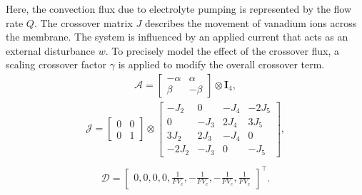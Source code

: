 Here, the convection flux due to electrolyte pumping is represented by the flow rate $Q$. The crossover matrix $J$ describes the movement of vanadium ions across the membrane. The system is influenced by an applied current that acts as an external disturbance $w$. To precisely model the effect of the crossover flux, a scaling crossover factor $\gamma$ is applied to modify the overall crossover term.
\begin{equation}
    \begin{gathered}
    \mathcal{A}=\left[\begin{array}{rr}
    -\alpha & \alpha \\
    \beta & -\beta
    \end{array}\right] \otimes \mathbf{I}_4,
    \end{gathered}
\end{equation}
\begin{equation}
    \begin{gathered}
    \mathcal{J}=\left[\begin{array}{ll}
    0 & 0 \\
    0 & 1
    \end{array}\right] \otimes\left[\begin{array}{rrrr}
    -J_2 & 0 & -J_4 & -2 J_5 \\
    0 & -J_3 & 2 J_4 & 3 J_5 \\
    3 J_2 & 2 J_3 & -J_4 & 0 \\
    -2 J_2 & -J_3 & 0 & -J_5
    \end{array}\right], \\
    \end{gathered}
\end{equation}
\begin{equation}
    \begin{gathered}
    \mathcal{D}=\left[\begin{array}{llllll}
    0,0,0,0,\frac{1}{F V_c},-\frac{1}{F V_c},-\frac{1}{F V_c},\frac{1}{F V_c}
    \end{array}\right]^{\top}.
    \end{gathered}
\end{equation}

